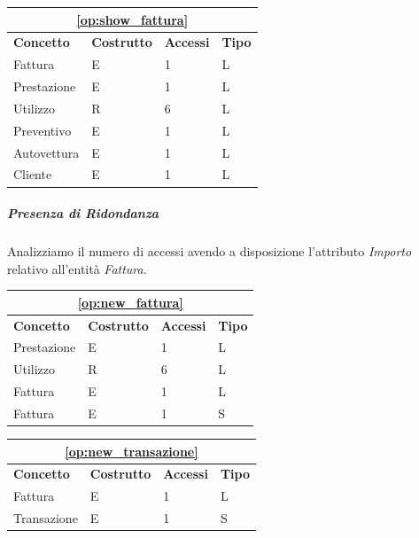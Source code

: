 					\begin{tabular}{| p{3cm} | p{3cm} | p{3cm} | p{3cm} |}
						\hline
						\multicolumn{4}{|c|}{\textbf{\ref{op:show_fattura}}} \\ \hline
						\textbf{Concetto} & \textbf{Costrutto} & \textbf{Accessi} & \textbf{Tipo} \\ \hline
						Fattura 	& E & 1 & L \\
						Prestazione & E & 1 & L \\
						Utilizzo 	& R & 6 & L \\
						Preventivo 	& E & 1 & L \\
						Autovettura & E & 1 & L \\
						Cliente 	& E & 1 & L \\
						\hline
					\end{tabular}
					\vspace{2ex}

				\subparagraph{Presenza di Ridondanza} 
					Analizziamo il numero di accessi avendo a disposizione l'attributo \emph{Importo} relativo all'entità \emph{Fattura}.

					\vspace{2ex}
					\begin{tabular}{| p{3cm} | p{3cm} | p{3cm} | p{3cm} |}
						\hline
						\multicolumn{4}{|c|}{\textbf{\ref{op:new_fattura}}} \\ \hline
						\textbf{Concetto} & \textbf{Costrutto} & \textbf{Accessi} & \textbf{Tipo} \\ \hline
						Prestazione & E & 1 & L \\
						Utilizzo 	& R & 6 & L \\
						Fattura 	& E & 1 & L \\
						Fattura 	& E & 1 & S \\
						\hline
					\end{tabular}

					\begin{tabular}{| p{3cm} | p{3cm} | p{3cm} | p{3cm} |}
						\hline
						\multicolumn{4}{|c|}{\textbf{\ref{op:new_transazione}}} \\ \hline
						\textbf{Concetto} & \textbf{Costrutto} & \textbf{Accessi} & \textbf{Tipo} \\ \hline
						Fattura & E & 1 & L \\
						Transazione & E & 1 & S \\
						\hline
					\end{tabular}

